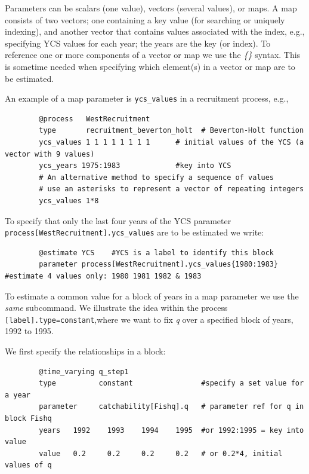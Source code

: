 Parameters can be scalars (one value), vectors (several values), or maps. A map consists of two vectors; one containing a key value (for searching or uniquely indexing), and another vector that contains values associated with the index, e.g., specifying YCS values for each year; the years are the key (or index).  To reference one or more components of a vector or map we use the \textit{\{\}} syntax. This is sometime needed when  specifying which element(s) in a vector or map are to be estimated.

An example of a map parameter is \texttt{ycs\_values} in a recruitment process, e.g.,

{\small{\begin{verbatim}
		@process   WestRecruitment
		type       recruitment_beverton_holt  # Beverton-Holt function
		ycs_values 1 1 1 1 1 1 1 1      # initial values of the YCS (a vector with 9 values)
		ycs_years 1975:1983             #key into YCS
		# An alternative method to specify a sequence of values
		# use an asterisks to represent a vector of repeating integers
		ycs_values 1*8
		\end{verbatim}}}

To specify that only the last four years of the YCS parameter \texttt{process[WestRecruitment].ycs\_values} are to be  estimated we write:

{\small{\begin{verbatim}
		@estimate YCS    #YCS is a label to identify this block
		parameter process[WestRecruitment].ycs_values{1980:1983}  #estimate 4 values only: 1980 1981 1982 & 1983
		\end{verbatim}}}

To estimate a common value for a block of years in a map parameter we use the \textit{same} subcommand. We illustrate the idea within the process \texttt{[label].type=constant},where we want to fix \textit{q} over a specified block of years, 1992 to 1995.

We first specify the relationships in a  block:

{\small{\begin{verbatim}
		@time_varying q_step1
		type          constant                #specify a set value for a year
		parameter     catchability[Fishq].q   # parameter ref for q in block Fishq
		years 	1992	1993	1994	1995  #or 1992:1995 = key into value
		value 	0.2		0.2		0.2		0.2   # or 0.2*4, initial values of q
		\end{verbatim}}}


